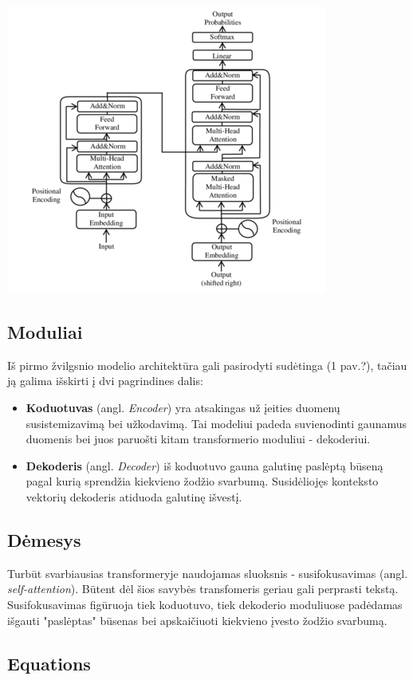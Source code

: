 \documentclass[conference]{IEEEtran}
\begin{document}
\centerline{\includegraphics[scale=0.5]{transformer.png}}

\subsection{Moduliai}
Iš pirmo žvilgsnio modelio architektūra gali pasirodyti sudėtinga (1 pav.?), tačiau ją galima išskirti į dvi pagrindines dalis:
\begin{itemize}
  \item \textbf{Koduotuvas} (angl. \textit{Encoder}) yra atsakingas už įeities duomenų susistemizavimą bei užkodavimą. Tai modeliui padeda suvienodinti gaunamus duomenis bei juos paruošti kitam transformerio moduliui - dekoderiui.
  \item \textbf{Dekoderis} (angl. \textit{Decoder}) iš koduotuvo gauna galutinę paslėptą būseną pagal kurią sprendžia kiekvieno žodžio svarbumą. Susidėliojęs konteksto vektorių dekoderis atiduoda galutinę išvestį.
\end{itemize}
\subsection{Dėmesys}
Turbūt svarbiausias transformeryje naudojamas sluoksnis - susifokusavimas (angl. \textit{self-attention}). Būtent dėl šios savybės transfomeris geriau gali perprasti tekstą. Susifokusavimas figūruoja tiek koduotuvo, tiek dekoderio moduliuose padėdamas išgauti "paslėptas" būsenas bei apskaičiuoti kiekvieno įvesto žodžio svarbumą. 

\subsection{Equations}
\end{document}
